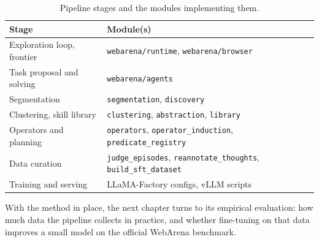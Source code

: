 \begin{table}[H]
\centering
\caption[Pipeline stages and implementation modules]{Pipeline stages and the
modules implementing them.}
\label{tab:modules}
\begin{tabular}{L{5.2cm} L{8.0cm}}
\toprule
\textbf{Stage} & \textbf{Module(s)} \\
\midrule
Exploration loop, frontier & \texttt{webarena/runtime}, \texttt{webarena/browser} \\
Task proposal and solving & \texttt{webarena/agents} \\
Segmentation & \texttt{segmentation}, \texttt{discovery} \\
Clustering, skill library & \texttt{clustering}, \texttt{abstraction}, \texttt{library} \\
Operators and planning & \texttt{operators}, \texttt{operator\_induction}, \texttt{predicate\_registry} \\
Data curation & \texttt{judge\_episodes}, \texttt{reannotate\_thoughts}, \texttt{build\_sft\_dataset} \\
Training and serving & LLaMA-Factory configs, vLLM scripts \\
\bottomrule
\end{tabular}
\end{table}

\vspace{1em}
\noindent
With the method in place, the next chapter turns to its empirical evaluation:
how much data the pipeline collects in practice, and whether fine-tuning on
that data improves a small model on the official WebArena benchmark.

